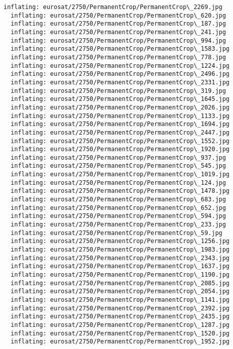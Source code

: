 \documentclass[11pt]{article}
\begin{document}
\begin{Verbatim}[commandchars=\\\{\}]
  inflating: eurosat/2750/PermanentCrop/PermanentCrop\_2269.jpg
  inflating: eurosat/2750/PermanentCrop/PermanentCrop\_620.jpg
  inflating: eurosat/2750/PermanentCrop/PermanentCrop\_187.jpg
  inflating: eurosat/2750/PermanentCrop/PermanentCrop\_241.jpg
  inflating: eurosat/2750/PermanentCrop/PermanentCrop\_994.jpg
  inflating: eurosat/2750/PermanentCrop/PermanentCrop\_1583.jpg
  inflating: eurosat/2750/PermanentCrop/PermanentCrop\_778.jpg
  inflating: eurosat/2750/PermanentCrop/PermanentCrop\_1224.jpg
  inflating: eurosat/2750/PermanentCrop/PermanentCrop\_2496.jpg
  inflating: eurosat/2750/PermanentCrop/PermanentCrop\_2331.jpg
  inflating: eurosat/2750/PermanentCrop/PermanentCrop\_319.jpg
  inflating: eurosat/2750/PermanentCrop/PermanentCrop\_1645.jpg
  inflating: eurosat/2750/PermanentCrop/PermanentCrop\_2026.jpg
  inflating: eurosat/2750/PermanentCrop/PermanentCrop\_1133.jpg
  inflating: eurosat/2750/PermanentCrop/PermanentCrop\_1694.jpg
  inflating: eurosat/2750/PermanentCrop/PermanentCrop\_2447.jpg
  inflating: eurosat/2750/PermanentCrop/PermanentCrop\_1552.jpg
  inflating: eurosat/2750/PermanentCrop/PermanentCrop\_1920.jpg
  inflating: eurosat/2750/PermanentCrop/PermanentCrop\_937.jpg
  inflating: eurosat/2750/PermanentCrop/PermanentCrop\_545.jpg
  inflating: eurosat/2750/PermanentCrop/PermanentCrop\_1019.jpg
  inflating: eurosat/2750/PermanentCrop/PermanentCrop\_124.jpg
  inflating: eurosat/2750/PermanentCrop/PermanentCrop\_1478.jpg
  inflating: eurosat/2750/PermanentCrop/PermanentCrop\_683.jpg
  inflating: eurosat/2750/PermanentCrop/PermanentCrop\_652.jpg
  inflating: eurosat/2750/PermanentCrop/PermanentCrop\_594.jpg
  inflating: eurosat/2750/PermanentCrop/PermanentCrop\_233.jpg
  inflating: eurosat/2750/PermanentCrop/PermanentCrop\_59.jpg
  inflating: eurosat/2750/PermanentCrop/PermanentCrop\_1256.jpg
  inflating: eurosat/2750/PermanentCrop/PermanentCrop\_1983.jpg
  inflating: eurosat/2750/PermanentCrop/PermanentCrop\_2343.jpg
  inflating: eurosat/2750/PermanentCrop/PermanentCrop\_1637.jpg
  inflating: eurosat/2750/PermanentCrop/PermanentCrop\_1190.jpg
  inflating: eurosat/2750/PermanentCrop/PermanentCrop\_2085.jpg
  inflating: eurosat/2750/PermanentCrop/PermanentCrop\_2054.jpg
  inflating: eurosat/2750/PermanentCrop/PermanentCrop\_1141.jpg
  inflating: eurosat/2750/PermanentCrop/PermanentCrop\_2392.jpg
  inflating: eurosat/2750/PermanentCrop/PermanentCrop\_2435.jpg
  inflating: eurosat/2750/PermanentCrop/PermanentCrop\_1287.jpg
  inflating: eurosat/2750/PermanentCrop/PermanentCrop\_1520.jpg
  inflating: eurosat/2750/PermanentCrop/PermanentCrop\_1952.jpg

\end{Verbatim}
\end{document}
